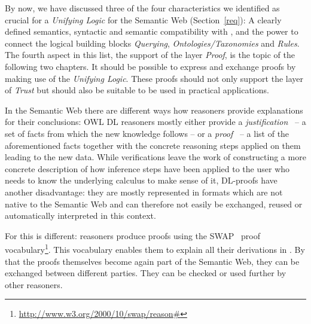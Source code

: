 By now, we have discussed three of the four characteristics we identified as crucial for a \emph{Unifying Logic} for the Semantic Web (Section~\ref{req}): 
A clearly defined semantics, 
syntactic and semantic compatibility with \rdf, and the power to connect the logical building blocks \emph{Querying}, \emph{Ontologies/Taxonomies} and \emph{Rules}. 
The fourth aspect in this list, the support of the layer \emph{Proof}, is the topic of the following two chapters. It should be possible to express and exchange proofs
 by making use of the \emph{Unifying Logic}. %
These proofs should not only support the layer of \emph{Trust} but should also be suitable to be used in practical applications.  

In the Semantic Web there are different ways how reasoners provide explanations for their conclusions:
OWL DL reasoners mostly either provide a \emph{justification}~\cite{just1,just2} -- a set of facts from which the new knowledge follows -- 
or a \emph{proof}~\cite{owlproof2,owlproof} -- 
a list of the aforementioned facts together with the concrete reasoning steps applied on them leading to the new data. 
While verifications leave the work of constructing a more concrete description of how inference steps have been applied to the user who needs to know the underlying calculus to make sense of it,
DL-proofs have another disadvantage: 
they are mostly represented in formats 
which are not native to the Semantic Web and can therefore not easily be exchanged, reused or automatically interpreted in this context.

For \nthree this is different: \nthree reasoners produce proofs using the SWAP~\cite{SWAP} proof 
vocabulary\footnote{\url{http://www.w3.org/2000/10/swap/reason\#}}. This vocabulary enables them to explain all their derivations in \nthree. 
By that the proofs themselves become again part of the Semantic Web, they can be exchanged between different parties. They can be checked or
used further by other reasoners.


